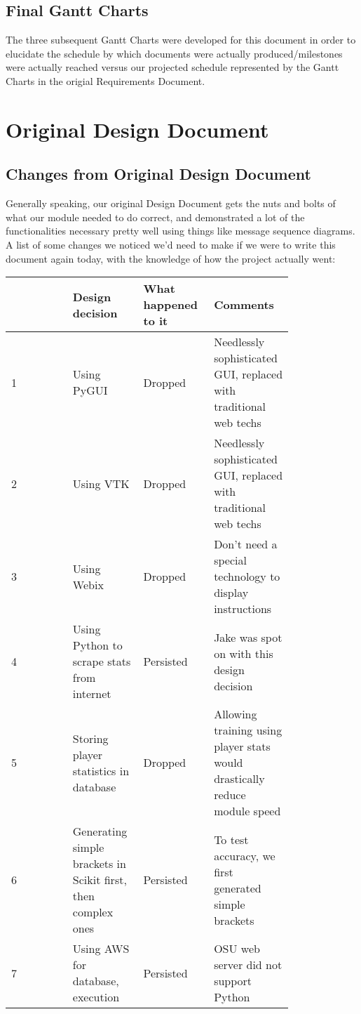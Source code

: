 \documentclass[onecolumn, draftclsnofoot,10pt, compsoc]{IEEEtran}
\begin{document}
\subsection{Final Gantt Charts}
The three subsequent Gantt Charts were developed for this document in order to elucidate the schedule by which documents were actually produced/milestones were actually reached versus our projected schedule represented by the Gantt Charts in the origial Requirements Document.


\section{Original Design Document}

\subsection{Changes from Original Design Document}
Generally speaking, our original Design Document gets the nuts and bolts of what our module needed to do correct, and demonstrated a lot of the functionalities necessary pretty well using things like message sequence diagrams. A list of some changes we noticed we'd need to make if we were to write this document again today, with the knowledge of how the project actually went:
\begin{center}
	\begin{tabular}{ || p{0.2\linewidth} || p{0.2\linewidth} || p{0.2\linewidth}  || p{0.2\linewidth} ||}
	\hline
 	  & Design decision & What happened to it & Comments \\ \hline
	1 & Using PyGUI & Dropped & Needlessly sophisticated GUI, replaced with traditional web techs \\ \hline
	2 & Using VTK & Dropped & Needlessly sophisticated GUI, replaced with traditional web techs \\ \hline
	3 & Using Webix & Dropped & Don't need a special technology to display instructions \\ \hline
	4 & Using Python to scrape stats from internet & Persisted & Jake was spot on with this design decision \\ \hline
	5 & Storing player statistics in database & Dropped & Allowing training using player stats would drastically reduce module speed \\ \hline
	6 & Generating simple brackets in Scikit first, then complex ones & Persisted & To test accuracy, we first generated simple brackets \\ \hline
	7 & Using AWS for database, execution & Persisted & OSU web server did not support Python \\
	\hline
	\end{tabular}
\end{center}
\end{document}

